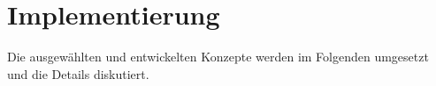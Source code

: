 \section{Implementierung}

Die ausgewählten und entwickelten Konzepte werden im Folgenden umgesetzt und die Details diskutiert.



